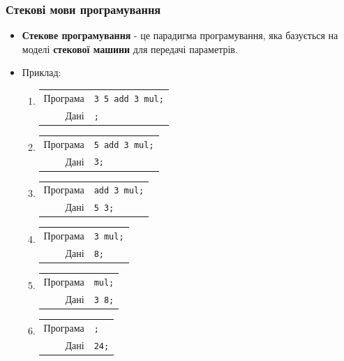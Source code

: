 \documentclass{beamer}
\begin{document}
\begin{frame}[fragile]
  \frametitle{Стекові мови програмування}
  \begin{itemize}
  \item \textbf{Стекове програмування} - це парадигма програмування, яка
    базується на моделі \textbf{стекової машини} для передачі параметрів.
  \item Приклад:
    \begin{enumerate}
    \item
      \begin{tabular}{rl}
        Програма &\texttt{3 5 add 3 mul;} \\
        Дані &\texttt{;} \\
      \end{tabular}
    \item
      \begin{tabular}{rl}
        Програма &\texttt{5 add 3 mul;} \\
        Дані &\texttt{3;} \\
      \end{tabular}
    \item
      \begin{tabular}{rl}
        Програма &\texttt{add 3 mul;} \\
        Дані &\texttt{5 3;} \\
      \end{tabular}
    \item
      \begin{tabular}{rl}
        Програма &\texttt{3 mul;} \\
        Дані &\texttt{8;} \\
      \end{tabular}
    \item
      \begin{tabular}{rl}
        Програма &\texttt{mul;} \\
        Дані &\texttt{3 8;} \\
      \end{tabular}
    \item
      \begin{tabular}{rl}
        Програма &\texttt{;} \\
        Дані &\texttt{24;} \\
      \end{tabular}
    \end{enumerate}
  \end{itemize}
\end{frame}
\end{document}
